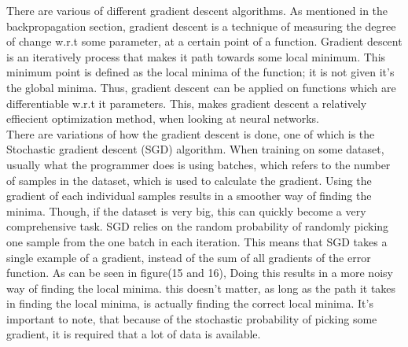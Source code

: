 There are various of different gradient descent algorithms. As mentioned in the backpropagation section, gradient descent is a technique of measuring the degree of change w.r.t some parameter, at a certain point of a function. Gradient descent is an iteratively process that makes it path towards some local minimum. This minimum point is defined as the local minima of the function; it is not given it's the global minima. Thus, gradient descent can be applied on functions which are differentiable w.r.t it parameters. This, makes gradient descent a relatively effiecient optimization method, when looking at neural networks.\\

\noindent
There are variations of how the gradient descent is done, one of which is the Stochastic gradient descent (SGD) algorithm. When training on some dataset, usually what the programmer does is using batches, which refers to the number of samples in the dataset, which is used to calculate the gradient. Using the gradient of each individual samples results in a smoother way of finding the minima. Though, if the dataset is very big, this can quickly become a very comprehensive task. SGD relies on the random probability of randomly picking one sample from the one batch in each iteration. This means that SGD takes a single example of a gradient, instead of the sum of all gradients of the error function. As can be seen in figure(15 and 16), Doing this results in a more noisy way of finding the local minima. this doesn't matter, as long as the path it takes in finding the local minima, is actually finding the correct local minima. It's important to note, that because of the stochastic probability of picking some gradient, it is required that a lot of data is available.





